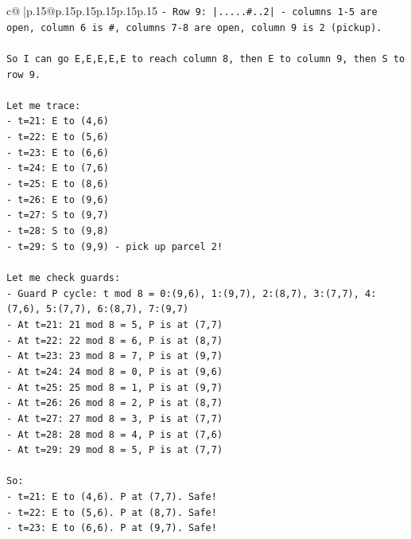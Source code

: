 \documentclass{article}
\begin{document}
{\begin{supertabular}{c@{$\;$}|p{.15\linewidth}@{}p{.15\linewidth}p{.15\linewidth}p{.15\linewidth}p{.15\linewidth}p{.15\linewidth}}
{{{\texttt{{-} Row 9: |.....\#..2| {-} columns 1{-}5 are open, column 6 is \#, columns 7{-}8 are open, column 9 is 2 (pickup).} \\
\\ 
\texttt{So I can go E,E,E,E,E to reach column 8, then E to column 9, then S to row 9.} \\
\\ 
\texttt{Let me trace:} \\
\texttt{{-} t=21: E to (4,6)} \\
\texttt{{-} t=22: E to (5,6)} \\
\texttt{{-} t=23: E to (6,6)} \\
\texttt{{-} t=24: E to (7,6)} \\
\texttt{{-} t=25: E to (8,6)} \\
\texttt{{-} t=26: E to (9,6)} \\
\texttt{{-} t=27: S to (9,7)} \\
\texttt{{-} t=28: S to (9,8)} \\
\texttt{{-} t=29: S to (9,9) {-} pick up parcel 2!} \\
\\ 
\texttt{Let me check guards:} \\
\texttt{{-} Guard P cycle: t mod 8 = 0:(9,6), 1:(9,7), 2:(8,7), 3:(7,7), 4:(7,6), 5:(7,7), 6:(8,7), 7:(9,7)} \\
\texttt{{-} At t=21: 21 mod 8 = 5, P is at (7,7)} \\
\texttt{{-} At t=22: 22 mod 8 = 6, P is at (8,7)} \\
\texttt{{-} At t=23: 23 mod 8 = 7, P is at (9,7)} \\
\texttt{{-} At t=24: 24 mod 8 = 0, P is at (9,6)} \\
\texttt{{-} At t=25: 25 mod 8 = 1, P is at (9,7)} \\
\texttt{{-} At t=26: 26 mod 8 = 2, P is at (8,7)} \\
\texttt{{-} At t=27: 27 mod 8 = 3, P is at (7,7)} \\
\texttt{{-} At t=28: 28 mod 8 = 4, P is at (7,6)} \\
\texttt{{-} At t=29: 29 mod 8 = 5, P is at (7,7)} \\
\\ 
\texttt{So:} \\
\texttt{{-} t=21: E to (4,6). P at (7,7). Safe!} \\
\texttt{{-} t=22: E to (5,6). P at (8,7). Safe!} \\
\texttt{{-} t=23: E to (6,6). P at (9,7). Safe!} \\
}}}
\end{supertabular}}
\end{document}
